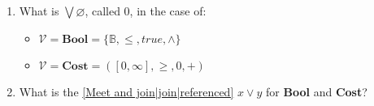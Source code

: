 
\begin{enumerate}
    \item   What is $\bigvee \varnothing$, called $0$, in the case of:
          \begin{itemize}
            \item $\mathcal{V}=\mathbf{Bool}=\{\mathbb{B},\leq, true,\land\}$
            \item $\mathcal{V}=\mathbf{Cost}=([0,\infty],\geq,0,+)$
          \end{itemize}
    \item What is the \ref{Meet and join|join|referenced} $x \vee y$ for \textbf{Bool} and \textbf{Cost}?
  \end{enumerate}